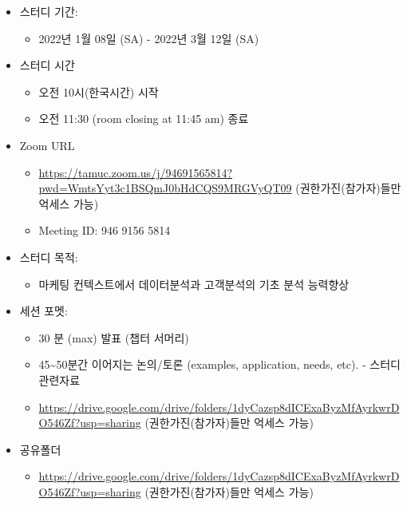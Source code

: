 \documentclass[
]{book}
\providecommand{\tightlist}{%
  \setlength{\itemsep}{0pt}\setlength{\parskip}{0pt}}
\begin{document}
\begin{itemize}
\tightlist
\item
  스터디 기간:

  \begin{itemize}
  \tightlist
  \item
    2022년 1월 08일 (SA) - 2022년 3월 12일 (SA)
  \end{itemize}
\item
  스터디 시간

  \begin{itemize}
  \tightlist
  \item
    오전 10시(한국시간) 시작
  \item
    오전 11:30 (room closing at 11:45 am) 종료
  \end{itemize}
\item
  Zoom URL

  \begin{itemize}
  \tightlist
  \item
    \url{https://tamuc.zoom.us/j/94691565814?pwd=WmtsYyt3c1BSQmJ0bHdCQS9MRGVyQT09} (권한가진(참가자)들만 억세스 가능)
  \item
    Meeting ID: 946 9156 5814
  \end{itemize}
\item
  스터디 목적:

  \begin{itemize}
  \tightlist
  \item
    마케팅 컨텍스트에서 데이터분석과 고객분석의 기초 분석 능력향상
  \end{itemize}
\item
  세션 포멧:

  \begin{itemize}
  \tightlist
  \item
    30 분 (max) 발표 (챕터 서머리)
  \item
    45\textasciitilde50분간 이어지는 논의/토론 (examples, application, needs, etc). - 스터디 관련자료
  \item
    \url{https://drive.google.com/drive/folders/1dyCazsp8dICExaByzMfAyrkwrDO546Zf?usp=sharing} (권한가진(참가자)들만 억세스 가능)
  \end{itemize}
\item
  공유폴더

  \begin{itemize}
  \tightlist
  \item
    \url{https://drive.google.com/drive/folders/1dyCazsp8dICExaByzMfAyrkwrDO546Zf?usp=sharing} (권한가진(참가자)들만 억세스 가능)
  \end{itemize}
\end{itemize}
\end{document}
